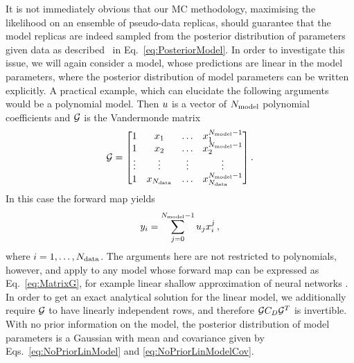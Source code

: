 It is not immediately obvious that our MC methodology, maximising the likelihood
on an ensemble of pseudo-data replicas, should guarantee that the model replicas
are indeed sampled from the posterior distribution of parameters given data as
described \eg\ in Eq.~\ref{eq:PosteriorModel}. In order to investigate this
issue, we will again consider a model, whose predictions are linear in the model
parameters, where the posterior distribution of model parameters can be written
explicitly. A practical example, which can
elucidate the following arguments would be a polynomial model. Then $u$ is a
vector of $N_{\rm model}$ polynomial coefficients and $\mathcal{G}$ is the Vandermonde matrix
\begin{equation}
    \mathcal{G} =
    \begin{bmatrix}
        1  & x_1 & \ldots& x_1^{N_{\rm model}-1} \\ 
        1  & x_2 & \ldots& x_2^{N_{\rm model}-1} \\ 
        \vdots  & \vdots & \vdots& \vdots \\ 
        1  & x_{N_{\rm data}} & \ldots & x_{N_{\rm data}}^{N_{\rm model}-1} 
    \end{bmatrix}.
\end{equation}
In this case the forward map yields
\begin{equation}
    \label{eq:PolyMod}
    y_i = \sum_{j=0}^{N_{\rm model}-1} u_j x_i^j\, , 
\end{equation}
where $i=1,\ldots,N_{\rm data}$. The arguments here are not restricted to polynomials,
however, and apply to any model whose forward map can be expressed as
Eq.~\eqref{eq:MatrixG}, for example linear shallow approximation of neural
networks \cite{ADVANI2020428}. In order to get an exact analytical solution
for the linear model, we additionally require $\mathcal{G}$ to have linearly
independent rows, and therefore $\mathcal{G} C_{D} \mathcal{G}^T$ is invertible.
With no prior information
on the model, the posterior
distribution of model parameters is a Gaussian with mean and covariance
given by Eqs.~\ref{eq:NoPriorLinModel} and \ref{eq:NoPriorLinModelCov}.

